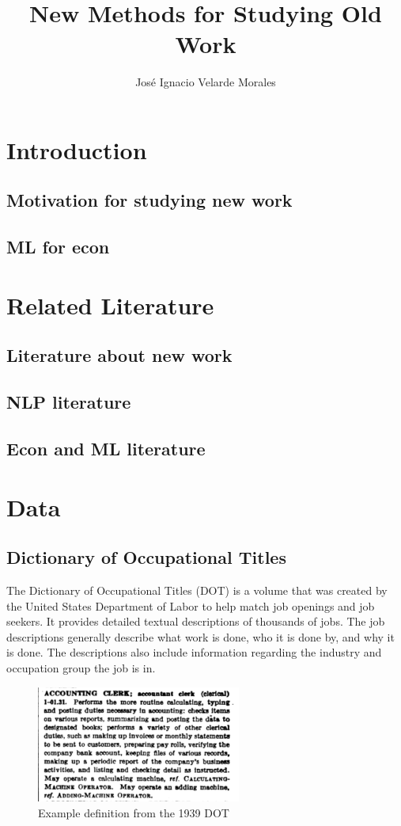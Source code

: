 \documentclass[11pt]{article}
\title{New Methods for Studying Old Work}
\author{José Ignacio Velarde Morales}
\begin{document}
\maketitle
\tableofcontents

\section{Introduction}
  \subsection{Motivation for studying new work}
  \subsection{ML for econ}

\section{Related Literature}
  \subsection{Literature about new work}
  \subsection{NLP literature}
  \subsection{Econ and ML literature}

\section{Data}
  \subsection{Dictionary of Occupational Titles}
  The Dictionary of Occupational Titles (DOT) is a volume that was created by the United States Department of Labor to help match job openings and job seekers. It provides detailed textual descriptions of thousands of jobs. The job descriptions generally describe what work is done, who it is done by, and why it is done. The descriptions also include information regarding the industry and occupation group the job is in.

  \begin{figure}[h]
    \centering
    \caption{Example definition from the 1939 DOT}
    \includegraphics[width=0.6\textwidth, keepaspectratio=true]{images/dot_def}
  \end{figure}
\end{document}
